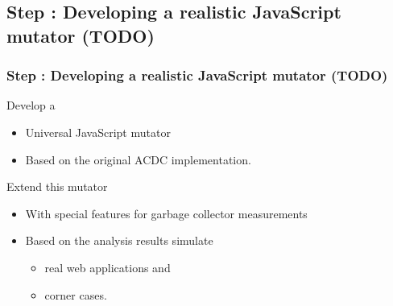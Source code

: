 \subsection{Step \theStepCounter: Developing a realistic JavaScript mutator (TODO)}
\begin{frame}
	\frametitle{Step \theStepCounter: Developing a realistic JavaScript mutator (TODO)}
	Develop a 
	\begin{itemize}
		\item Universal JavaScript mutator
		\item Based on the original ACDC implementation.
	\end{itemize}
		
	\pause
		
	Extend this mutator
	\begin{itemize}
		\item With special features for garbage collector measurements
		\item Based on the analysis results simulate
		\begin{itemize}
			\item real web applications and
			\item corner cases. 
		\end{itemize}
	\end{itemize}
\end{frame}